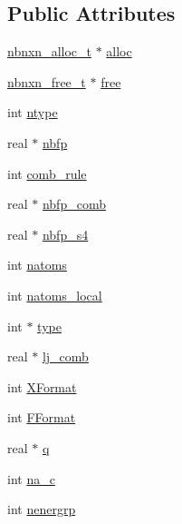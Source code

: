 \subsection*{\-Public \-Attributes}
\begin{DoxyCompactItemize}
\item 
\hyperlink{share_2template_2gromacs_2types_2nbnxn__pairlist_8h_adb326a71f76686d6e0c17d6ff3a9405b}{nbnxn\-\_\-alloc\-\_\-t} $\ast$ \hyperlink{structnbnxn__atomdata__t_ad5c6f82120795ca76b6fc7f5aa390627}{alloc}
\item 
\hyperlink{share_2template_2gromacs_2types_2nbnxn__pairlist_8h_ab3befa5b0a53bd74a7047db01c6cf9da}{nbnxn\-\_\-free\-\_\-t} $\ast$ \hyperlink{structnbnxn__atomdata__t_a00805a2a48329c4fea1c9b910ad25b05}{free}
\item 
int \hyperlink{structnbnxn__atomdata__t_a215aea1a2116c0230412e6e666cf4d65}{ntype}
\item 
real $\ast$ \hyperlink{structnbnxn__atomdata__t_a4cd4ed02c9c9bc27ffae9bdcec91e508}{nbfp}
\item 
int \hyperlink{structnbnxn__atomdata__t_aab17a98a67b31831bea590ae0a5db5b9}{comb\-\_\-rule}
\item 
real $\ast$ \hyperlink{structnbnxn__atomdata__t_a9d1757f00a8a60c558425e2b31704e7e}{nbfp\-\_\-comb}
\item 
real $\ast$ \hyperlink{structnbnxn__atomdata__t_a4f680d07a4b0080a636bb41fc3e00620}{nbfp\-\_\-s4}
\item 
int \hyperlink{structnbnxn__atomdata__t_aba96d9e917350bf52f0acfedb02f0eef}{natoms}
\item 
int \hyperlink{structnbnxn__atomdata__t_a8cd3a5d877728d3a2f3c7dbf63047c79}{natoms\-\_\-local}
\item 
int $\ast$ \hyperlink{structnbnxn__atomdata__t_a750b7c0afa4f54b2a49c58d8b22a6936}{type}
\item 
real $\ast$ \hyperlink{structnbnxn__atomdata__t_ae60d9c292c62501f2458f11397730127}{lj\-\_\-comb}
\item 
int \hyperlink{structnbnxn__atomdata__t_a8c0d74f2e99e1239e22dbe6b63cc590d}{\-X\-Format}
\item 
int \hyperlink{structnbnxn__atomdata__t_ae646dd01da91f4c1fdac62eb0c148077}{\-F\-Format}
\item 
real $\ast$ \hyperlink{structnbnxn__atomdata__t_ab6830912589900e0ada50bbfa9d9cb4e}{q}
\item 
int \hyperlink{structnbnxn__atomdata__t_a6d121d79ece552f5c90f37e8e367d8d4}{na\-\_\-c}
\item 
int \hyperlink{structnbnxn__atomdata__t_a40874c5d995d2a49b92346ad84c68862}{nenergrp}

\end{DoxyCompactItemize}
